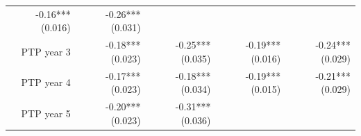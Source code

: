 \documentclass[]{article}
\begin{document}
\begin{longtable}[c]{@{}rrrrr@{}}
\begin{minipage}[t]{0.18\columnwidth}\raggedleft\strut
-0.16*** (0.016)
\strut\end{minipage} &
\begin{minipage}[t]{0.15\columnwidth}\raggedleft\strut
-0.26*** (0.031)
\strut\end{minipage}\tabularnewline
\begin{minipage}[t]{0.17\columnwidth}\raggedleft\strut
PTP year 3
\strut\end{minipage} &
\begin{minipage}[t]{0.20\columnwidth}\raggedleft\strut
-0.18*** (0.023)
\strut\end{minipage} &
\begin{minipage}[t]{0.16\columnwidth}\raggedleft\strut
-0.25*** (0.035)
\strut\end{minipage} &
\begin{minipage}[t]{0.18\columnwidth}\raggedleft\strut
-0.19*** (0.016)
\strut\end{minipage} &
\begin{minipage}[t]{0.15\columnwidth}\raggedleft\strut
-0.24*** (0.029)
\strut\end{minipage}\tabularnewline
\begin{minipage}[t]{0.17\columnwidth}\raggedleft\strut
PTP year 4
\strut\end{minipage} &
\begin{minipage}[t]{0.20\columnwidth}\raggedleft\strut
-0.17*** (0.023)
\strut\end{minipage} &
\begin{minipage}[t]{0.16\columnwidth}\raggedleft\strut
-0.18*** (0.034)
\strut\end{minipage} &
\begin{minipage}[t]{0.18\columnwidth}\raggedleft\strut
-0.19*** (0.015)
\strut\end{minipage} &
\begin{minipage}[t]{0.15\columnwidth}\raggedleft\strut
-0.21*** (0.029)
\strut\end{minipage}\tabularnewline
\begin{minipage}[t]{0.17\columnwidth}\raggedleft\strut
PTP year 5
\strut\end{minipage} &
\begin{minipage}[t]{0.20\columnwidth}\raggedleft\strut
-0.20*** (0.023)
\strut\end{minipage} &
\begin{minipage}[t]{0.16\columnwidth}\raggedleft\strut
-0.31*** (0.036)
\strut\end{minipage} &

\end{longtable}
\end{document}
